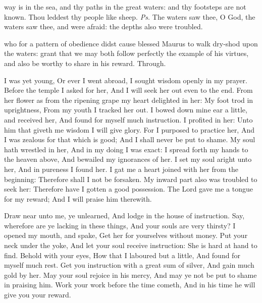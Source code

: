 
\introit
{} way is in the sea, and thy paths in the great waters: and thy footsteps are not known. Thou leddest thy people like sheep. \textit{Ps.} The waters saw thee, O God, the waters saw thee, and were afraid: the depths also were troubled.

\collect
{} who for a pattern of obedience didst cause blessed Maurus to walk dry-shod upon the waters: grant that we may both follow perfectly the example of his virtues, and also be worthy to share in his reward. Through.

 I was yet young, Or ever I went abroad, I sought wisdom openly in my prayer. Before the temple I asked for her, And I will seek her out even to the end. From her flower as from the ripening grape my heart delighted in her: My foot trod in uprightness, From my youth I tracked her out. I bowed down mine ear a little, and received her, And found for myself much instruction. I profited in her: Unto him that giveth me wisdom I will give glory. For I purposed to practice her, And I was zealous for that which is good; And I shall never be put to shame. My soul hath wrestled in her, And in my doing I was exact: I spread forth my hands to the heaven above, And bewailed my ignorances of her. I set my soul aright unto her, And in pureness I found her. I gat me a heart joined with her from the beginning: Therefore shall I not be forsaken. My inward part also was troubled to seek her: Therefore have I gotten a good possession. The Lord gave me a tongue for my reward; And I will praise him therewith.
\par
Draw near unto me, ye unlearned, And lodge in the house of instruction. Say, wherefore are ye lacking in these things, And your souls are very thirsty? I opened my mouth, and spake, Get her for yourselves without money. Put your neck under the yoke, And let your soul receive instruction: She is hard at hand to find. Behold with your eyes, How that I laboured but a little, And found for myself much rest. Get you instruction with a great sum of silver, And gain much gold by her. May your soul rejoice in his mercy, And may ye not be put to shame in praising him. Work your work before the time cometh, And in his time he will give you your reward. 


